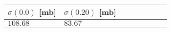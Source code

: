 \begin{tabular}{llllllll} \hline
\toprule 
 $\sigma(0.0)$ [mb]  &  $\sigma(0.20)$ [mb]  \\ \midrule 
 $\num{108.68}$ & $\num{83.67}$\\ 
 \bottomrule 
\end{tabular}
